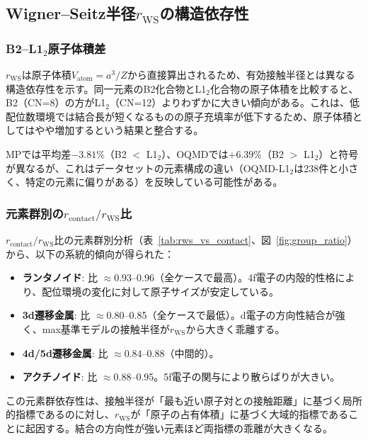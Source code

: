 \documentclass[a4paper,10pt,5p]{elsarticle}
\begin{document}
\subsection{Wigner--Seitz半径$r_\mathrm{WS}$の構造依存性}

\subsubsection{B2--L1$_2$原子体積差}
$r_\mathrm{WS}$は原子体積$V_\mathrm{atom} = a^3/Z$から直接算出されるため、有効接触半径とは異なる構造依存性を示す。同一元素のB2化合物とL1$_2$化合物の原子体積を比較すると、B2（CN=8）の方がL1$_2$（CN=12）よりわずかに大きい傾向がある。これは、低配位数環境では結合長が短くなるものの原子充填率が低下するため、原子体積としてはやや増加するという結果と整合する。

MPでは平均差$-3.81$\%（B2 $<$ L1$_2$）、OQMDでは$+6.39$\%（B2 $>$ L1$_2$）と符号が異なるが、これはデータセットの元素構成の違い（OQMD-L1$_2$は238件と小さく、特定の元素に偏りがある）を反映している可能性がある。

\subsubsection{元素群別の$r_\mathrm{contact}/r_\mathrm{WS}$比}
$r_\mathrm{contact}/r_\mathrm{WS}$比の元素群別分析（表~\ref{tab:rws_vs_contact}、図~\ref{fig:group_ratio}）から、以下の系統的傾向が得られた：

\begin{itemize}
\setlength{\parskip}{0cm}
\setlength{\itemsep}{0cm}
    \item \textbf{ランタノイド}: 比 $\approx 0.93$--0.96（全ケースで最高）。4f電子の内殻的性格により、配位環境の変化に対して原子サイズが安定している。
    \item \textbf{3d遷移金属}: 比 $\approx 0.80$--0.85（全ケースで最低）。d電子の方向性結合が強く、max基準モデルの接触半径が$r_\mathrm{WS}$から大きく乖離する。
    \item \textbf{4d/5d遷移金属}: 比 $\approx 0.84$--0.88（中間的）。
    \item \textbf{アクチノイド}: 比 $\approx 0.88$--0.95。5f電子の関与により散らばりが大きい。
\end{itemize}

この元素群依存性は、接触半径が「最も近い原子対との接触距離」に基づく局所的指標であるのに対し、$r_\mathrm{WS}$が「原子の占有体積」に基づく大域的指標であることに起因する。結合の方向性が強い元素ほど両指標の乖離が大きくなる。
\end{document}

